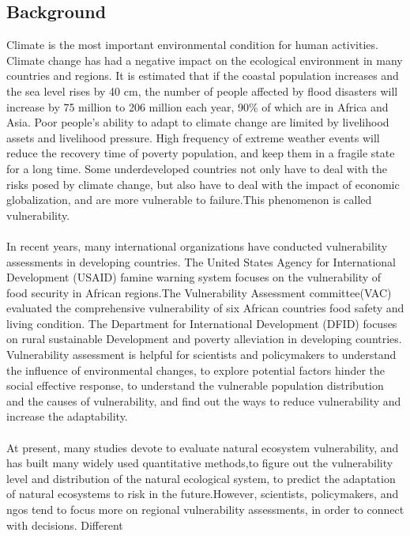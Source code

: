 \documentclass{mcmthesis}
\begin{document}
\subsection{Background}
Climate is the most important environmental condition for human activities.
Climate change has had a negative impact on the ecological environment in 
many countries and regions. It is estimated that if the coastal population 
increases and the sea level rises by 40 cm, the number of people affected by 
flood disasters will increase by 75 million to 206 million each year, 90\% of
which are in Africa and Asia. Poor people's ability to adapt to climate change 
are limited by livelihood assets and livelihood pressure. High frequency of
extreme weather events will reduce the recovery time of poverty population, 
and keep them in a fragile state for a long time. Some underdeveloped 
countries not only have to deal with the risks posed by climate change, 
but also have to deal with the impact of economic globalization, 
and are more vulnerable to failure.This phenomenon is called vulnerability.\\\\
In recent years, many international organizations have conducted vulnerability 
assessments in developing countries. The United States Agency for International
Development (USAID) famine warning system focuses on the vulnerability of 
food security in African regions.The Vulnerability Assessment committee(VAC) 
evaluated the comprehensive vulnerability of six African countries food safety 
and living condition. The Department for International Development (DFID)
focuses on rural sustainable Development and poverty alleviation in developing
countries. Vulnerability assessment is helpful for scientists and 
policymakers to understand the influence of environmental changes, 
to explore potential factors hinder the social effective response, 
to understand the vulnerable population distribution and the causes 
of vulnerability, and find out the ways to reduce vulnerability and 
increase the adaptability.\\\\
At present, many studies devote to evaluate natural ecosystem vulnerability, 
and has built many widely used quantitative methods,to figure out the 
vulnerability level and distribution of the natural ecological system, 
to predict the adaptation of natural ecosystems to risk in the future.However, 
scientists, policymakers, and ngos tend to focus more on regional 
vulnerability assessments, in order to connect with decisions. Different 
\end{document}
